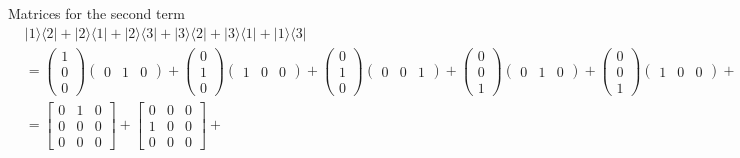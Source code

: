 \documentclass[letter]{article}
\begin{document}
Matrices for the second term 
\begin{align*}
&	| 1 \rangle \langle 2 | + | 2 \rangle \langle 1  | +
	| 2 \rangle \langle 3 | + | 3 \rangle \langle 2 | + 
	| 3 \rangle \langle 1 | + | 1 \rangle \langle 3 |  \\ 
	&= 
	\begin{pmatrix} 1\\0\\0 \end{pmatrix} \begin{pmatrix} 0&1&0 \end{pmatrix} +
	\begin{pmatrix} 0\\1\\0 \end{pmatrix} \begin{pmatrix} 1&0&0 \end{pmatrix}  +
	\begin{pmatrix} 0\\1\\0 \end{pmatrix} \begin{pmatrix} 0&0&1 \end{pmatrix} + 
	\begin{pmatrix} 0\\0\\1 \end{pmatrix} \begin{pmatrix} 0&1&0 \end{pmatrix} + 
	\begin{pmatrix} 0\\0\\1 \end{pmatrix} \begin{pmatrix} 1&0&0 \end{pmatrix} + 
	\begin{pmatrix} 1\\0\\0 \end{pmatrix} \begin{pmatrix} 0&0&1 \end{pmatrix} 
	\\
	&= 
	\begin{bmatrix} 0&1&0\\0&0&0\\0&0&0 \end{bmatrix} + 
	\begin{bmatrix} 0&0&0\\1&0&0\\0&0&0 \end{bmatrix} +

\end{align*}
\end{document}
